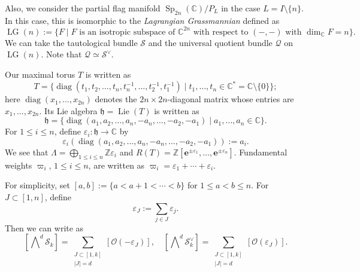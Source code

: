 \documentclass[a4paper, 11pt, reqno]{amsart}
\numberwithin{equation}{section}
\newcommand{\BZ}{\mathbb{Z}}
\newcommand{\BC}{\mathbb{C}}
\newcommand{\CO}{\mathcal{O}}
\newcommand{\CQ}{\mathcal{Q}}
\newcommand{\CS}{\mathcal{S}}
\newcommand{\Fh}{\mathfrak{h}}
\newcommand{\ve}{\varepsilon}
\newcommand{\vpi}{\varpi}
\newcommand{\e}{\mathbf{e}}
\newcommand{\Sp}[1]{\operatorname{Sp}_{#1}(\BC)}
\newcommand{\LG}{\operatorname{LG}}
\newcommand{\class}[1]{\left[ #1 \right]}
\newcommand{\extprod}{\bigwedge\nolimits}
\DeclareMathOperator{\Lie}{Lie}
\DeclareMathOperator{\diag}{diag}
\theoremstyle{plain}
\theoremstyle{definition}
\theoremstyle{remark}
\begin{document}
Also, we consider the partial flag manifold $\Sp{2n}/P_{L}$ in the case $L = I \setminus \{n\}$. In this case, this is isomorphic to the \emph{Lagrangian Grassmannian} defined as 
\begin{equation}
\LG(n) := \{ F \mid \text{$F$ is an isotropic subspace of $\BC^{2n}$ with respect to $(-, -)$ with $\dim_{\BC}F = n$} \}. 
\end{equation}
We can take the tautological bundle $\CS$ and the universal quotient bundle $\CQ$ on $\LG(n)$. Note that $\CQ \simeq \CS^{\vee}$. 

Our maximal torus $T$ is written as 
\begin{equation}
T = \{ \diag(t_{1}, t_{2}, \ldots, t_{n}, t_{n}^{-1}, \ldots, t_{2}^{-1}, t_{1}^{-1}) \mid t_{1}, \ldots, t_{n} \in \BC^{\ast} = \BC \setminus \{0\} \}; 
\end{equation}
here $\diag(x_{1}, \ldots, x_{2n})$ denotes the $2n \times 2n$-diagonal matrix whose entries are $x_{1}, \ldots, x_{2n}$. 
Its Lie algebra $\Fh = \Lie(T)$ is written as 
\begin{equation}
\Fh = \{ \diag (a_{1}, a_{2}, \ldots, a_{n}, -a_{n}, \ldots, -a_{2}, -a_{1}) \mid a_{1}, \ldots, a_{n} \in \BC \}. 
\end{equation}
For $1 \le i \le n$, define $\ve_{i}: \Fh \rightarrow \BC$ by 
\begin{equation}
\ve_{i}(\diag(a_{1}, a_{2}, \ldots, a_{n}, -a_{n}, \ldots, -a_{2}, -a_{1})) := a_{i}. 
\end{equation}
We see that $\Lambda = \bigoplus_{1 \le i \le n} \BZ\ve_{i}$ and $R(T) = \BZ[\e^{\pm \ve_{1}}, \ldots, \e^{\pm \ve_{n}}]$. 
Fundamental weights $\vpi_{i}$, $1 \le i \le n$, are written as $\vpi_{i} = \ve_{1} + \cdots + \ve_{i}$. 

For simplicity, set $[a, b] := \{a < a+1 < \cdots < b\}$ for $1 \le a < b \le n$. 
For $J \subset [1, n]$, define 
\begin{equation}
\ve_{J} := \sum_{j \in J} \ve_{j}. 
\end{equation}
Then we can write as 
\begin{equation}
\class{\extprod^{d} \CS_{k}} = \sum_{\substack{J \subset [1, k] \\ |J| = d}} [\CO(-\ve_{J})], \quad \class{\extprod^{d} \CS_{k}^{\vee}} = \sum_{\substack{J \subset [1, k] \\ |J| = d}} [\CO(\ve_{J})]. 
\end{equation}
\end{document}
